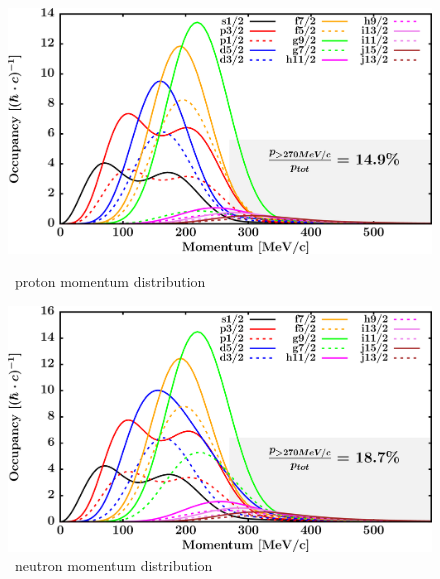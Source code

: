 \begin{figure}[hbtp]
    \centering
    \begin{minipage}{0.45\textwidth}
        \centering
        \includegraphics[width=\textwidth]{figures/sn112_protonLJMomentumDistIntegral.png}
        \caption*{\snTwelve\ proton momentum distribution}
        \label{DOMFitData_sn112_proton_momentumDist}
    \end{minipage}\hspace{6pt}
    \begin{minipage}{0.45\textwidth}
        \centering
        \includegraphics[width=\textwidth]{figures/sn112_neutronLJMomentumDistIntegral.png}
        \caption*{\snTwelve\ neutron momentum distribution}
        \label{DOMFitData_sn112_neutron_momentumDist}
    \end{minipage}
\end{figure}
\vspace{0.3in}
